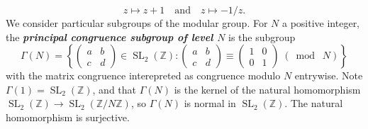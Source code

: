 \documentclass[10pt,leqno]{article}
\theoremstyle{plain}
\theoremstyle{definition}
\numberwithin{equation}{section}
\numberwithin{lem}{section}
\newcommand{\cbr}[1]{\left\{#1\right\}}
\newcommand{\textib}[1]{\textbf{\textit{#1}}}
\DeclareMathOperator{\SL}{SL}
\newcommand{\smod}[1]{\;(\bmod\; #1)}
\begin{document}
\[z\mapsto z+1\quad\text{and}\quad z\mapsto -1/z.\]
We consider particular subgroups of the modular group. For $N$ a positive integer, the \textib{principal congruence subgroup of level $N$} is the subgroup
\[\varGamma(N) = \cbr{\begin{pmatrix}
    a & b \\ c & d
\end{pmatrix}\in \SL_2(\mathbb{Z}): \begin{pmatrix}
    a & b \\ c & d
\end{pmatrix}\equiv \begin{pmatrix}
    1 & 0 \\ 0 & 1
\end{pmatrix}\smod N}\]
with the matrix congruence interepreted as congruence modulo $N$ entrywise. Note $\varGamma(1) = \SL_2(\mathbb{Z})$, and that $\varGamma(N)$ is the kernel of the natural homomorphism $\SL_2(\mathbb{Z})\to \SL_2(\mathbb{Z}/N\mathbb{Z})$, so $\varGamma(N)$ is normal in $\SL_2(\mathbb{Z})$. The natural homomorphism is surjective.
\end{document}
